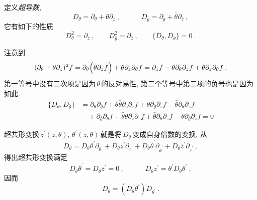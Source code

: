 定义{\emph{超导数}},
\begin{equation}
    D_{\theta} = \partial_{\theta} + \theta \partial_{z}\:, \qquad \quad 
    D_{\bar{\theta}} = \partial_{\bar{\theta}}+ \bar{\theta}\partial_{\bar{z}} \:, \label{12.3.3}
\end{equation}
它有如下的性质
\begin{equation}
    D_{\theta}^{2} = \partial_{z}\:, \qquad D_{\bar{\theta}}^{2} = \partial_{\bar{z}}\:,\qquad
    \{D_{\theta},D_{\bar{\theta}}\} = 0 \:. \label{12.3.4}
\end{equation}
\begin{tcolorbox}
注意到
\begin{align*}
    (\partial_{\theta}+\theta\partial_{z})^{2}f =\partial_{\theta}\Bigl(\theta \partial_{z}f\Bigr)
    +\theta \partial_{z}\partial_{\theta} f = \partial_{z}f - \theta \partial_{\theta}\partial_{z}f
    +\theta \partial_{z}\partial_{\theta} f \:,
\end{align*}
第一等号中没有二次项是因为$\,\theta\,$的反对易性, 第二个等号中第二项的负号也是因为如此.
\begin{align*}
    \{D_{\theta},D_{\bar{\theta}}\} &=\partial_{\theta}\partial_{\bar{\theta}}f+ \theta\bar{\theta}\partial_{z}\partial_{\bar{z}}f+\theta\partial_{\bar{\theta}}\partial_{z}f
    -\bar{\theta}\partial_{\theta}\partial_{\bar{z}}f \\
    &\quad +\partial_{\bar{\theta}}\partial_{\theta}f+ \bar{\theta}\theta\partial_{z}\partial_{\bar{z}}f
    +\bar{\theta}\partial_{\theta}\partial_{\bar{z}}f -\theta\partial_{\bar{\theta}}\partial_{z}f =0
\end{align*}
\end{tcolorbox}
\noindent 超共形变换$\,z^{\prime}(z,\theta)$, $\theta^{\prime}(z,\theta)\,$就是将$\,D_{\theta}\,$变成自身倍数的变换. 从
\begin{equation}
    D_{\theta} = D_{\theta} \theta^{\prime} \partial_{\theta^{\prime}}
    +D_{\theta}z^{\prime}\partial_{z^{\prime}} + D_{\theta}\bar{\theta}^{\prime}\partial_{\bar{\theta}^{\prime}}
    +D_{\theta}\bar{z}^{\prime}\partial_{\bar{z}^{\prime}} \:, \label{12.3.5}
\end{equation}
得出超共形变换满足
\begin{equation}
     D_{\theta}\bar{\theta}^{\prime}=D_{\theta}\bar{z}^{\prime}=0\:, \qquad \quad
     D_{\theta}z^{\prime} = \theta^{\prime}D_{\theta}\theta^{\prime} \:, \label{12.3.6}
\end{equation}
因而
\begin{equation}
    D_{\theta}= (D_{\theta}\theta^{\prime})D_{\theta^{\prime}} \:. \label{12.3.7}
\end{equation}
